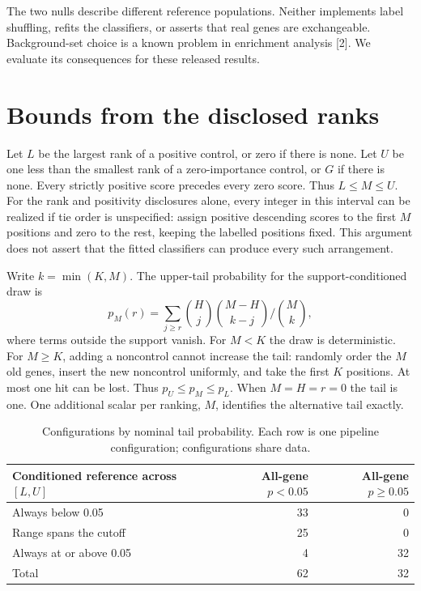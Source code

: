 \documentclass[11pt]{article}
\begin{document}
The two nulls describe different reference populations. Neither implements label shuffling, refits the classifiers, or asserts that real genes are exchangeable. Background-set choice is a known problem in enrichment analysis [2]. We evaluate its consequences for these released results.

\newpage
\section{Bounds from the disclosed ranks}
Let $L$ be the largest rank of a positive control, or zero if there is none. Let $U$ be one less than the smallest rank of a zero-importance control, or $G$ if there is none. Every strictly positive score precedes every zero score. Thus $L\le M\le U$. For the rank and positivity disclosures alone, every integer in this interval can be realized if tie order is unspecified: assign positive descending scores to the first $M$ positions and zero to the rest, keeping the labelled positions fixed. This argument does not assert that the fitted classifiers can produce every such arrangement.

Write $k=\min(K,M)$. The upper-tail probability for the support-conditioned draw is
\[
 p_M(r)=\sum_{j\ge r}\binom{H}{j}\binom{M-H}{k-j}\big/\binom{M}{k},
\]
where terms outside the support vanish. For $M<K$ the draw is deterministic. For $M\ge K$, adding a noncontrol cannot increase the tail: randomly order the $M$ old genes, insert the new noncontrol uniformly, and take the first $K$ positions. At most one hit can be lost. Thus $p_U\le p_M\le p_L$. When $M=H=r=0$ the tail is one. One additional scalar per ranking, $M$, identifies the alternative tail exactly.

\begin{table}[h]\centering
\caption{Configurations by nominal tail probability. Each row is one pipeline configuration; configurations share data.}
\begin{tabular}{lrr}\toprule
Conditioned reference across $[L,U]$ & All-gene $p<0.05$ & All-gene $p\ge0.05$\\\midrule
Always below 0.05 & 33 & 0\\
Range spans the cutoff & 25 & 0\\
Always at or above 0.05 & 4 & 32\\\midrule
Total & 62 & 32\\\bottomrule
\end{tabular}
\end{table}
\end{document}
